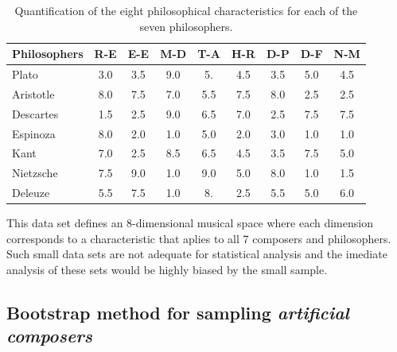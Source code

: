 \documentclass[
 aip,
 jmp,
 amsmath,amssymb,
 reprint,
]{revtex4-1}
\begin{document}
\begin{table}%
\caption{\label{tab:tableAphi}Quantification of the
eight philosophical characteristics for each of the seven philosophers.  }

\begin{ruledtabular}
\begin{tabular}{|l||c|c|c|c|c|c|c|c|}

Philosophers & R-E & E-E & M-D & T-A & H-R & D-P & D-F & N-M \\ \hline

Plato  & 3.0 &   3.5 &   9.0  &   5.  &   4.5 &   3.5 &   5.0 &   4.5 \\

Aristotle & 8.0 &   7.5 &   7.0  &   5.5 &   7.5 &   8.0 &   2.5 &   2.5 \\

Descartes & 1.5 &   2.5 &   9.0  &   6.5 &   7.0 &   2.5 &   7.5 &   7.5 \\

Espinoza     & 8.0 &   2.0 &   1.0  &   5.0 &   2.0 &   3.0 &   1.0 &   1.0 \\

Kant      & 7.0 &   2.5 &   8.5  &   6.5 &   4.5 &   3.5 &   7.5 &   5.0 \\

Nietzsche & 7.5 &   9.0 &   1.0  &   9.0 &   5.0 &   8.0 &   1.0 &   1.5 \\

Deleuze   & 5.5 &   7.5 &   1.0  &   8.  &   2.5 &   5.5 &   5.0 &   6.0 \\
\end{tabular}
\end{ruledtabular}
\end{table}


This data set defines an 8-dimensional musical space where each dimension
corresponds to a characteristic that aplies to all 7 composers and philosophers. 
Such small data sets are not adequate for statistical analysis and the imediate analysis of these sets would
be highly biased by the small sample.


\subsection{Bootstrap method for sampling \emph{artificial composers}}
\end{document}
